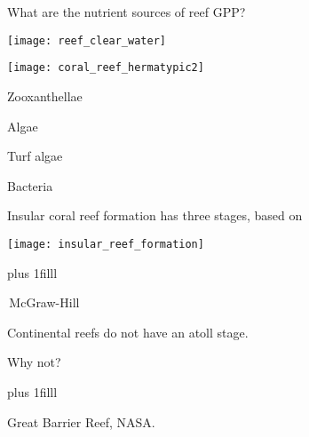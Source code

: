 \documentclass[t,handout]{beamer}  %
\begin{document}

\begin{frame}[t]{What are the nutrient sources of reef GPP?}
	\begin{multicols}{2}
		\begin{center}
		\texttt{[image: reef\_clear\_water]}
		
		\vspace*{1ex}
		
		\texttt{[image: coral\_reef\_hermatypic2]}
		\end{center}
		
	\columnbreak
	
		\hangpara Zooxanthellae \pause
		
		\hangpara Algae
		
		\hangpara Turf algae \pause
		
		\hangpara Bacteria
		
	\end{multicols}
\end{frame}




\begin{frame}[t]{Insular coral reef formation has three stages, based on }

\texttt{[image: insular\_reef\_formation]}

\vskip0pt plus 1filll

\tiny\textcopyright\,McGraw-Hill
\end{frame}

{
\begin{frame}[t]


\vspace*{2\baselineskip}

\hangpara\hspace*{60mm}\parbox[t]{1.5in}{Continental reefs do not have an atoll stage.}

\vspace*{\baselineskip}

\hangpara\hspace*{60mm}\parbox[t]{1.5in}{Why not?}

\vskip0pt plus 1filll

\hfill\tiny Great Barrier Reef, NASA.
\end{frame}
}
\end{document}
